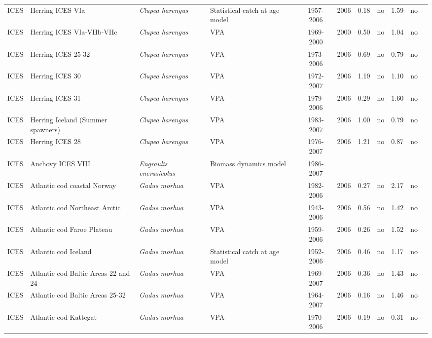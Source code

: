 \begin{longtable}{p{1.8cm}p{3.5cm}p{3.5cm}p{3cm}cccp{0.9cm}cp{0.9cm}c}
  ICES & Herring ICES VIa & \textit{Clupea harengus} & Statistical catch at age model & 1957-2006 & 2006 & 0.18 & no & 1.59 & no & \cite{ICES-HAWG-2007.pdf} \\ 
  ICES & Herring ICES VIa-VIIb-VIIc & \textit{Clupea harengus} & VPA & 1969-2000 & 2000 & 0.50 & no & 1.04 & no & \cite{ICES-HAWG-2007.pdf} \\ 
  ICES & Herring ICES 25-32 & \textit{Clupea harengus} & VPA & 1973-2006 & 2006 & 0.69 & no & 0.79 & no & \cite{ICES-WGBFAS-2007.pdf} \\ 
  ICES & Herring ICES 30 & \textit{Clupea harengus} & VPA & 1972-2007 & 2006 & 1.19 & no & 1.10 & no & \cite{ICES-WGBFAS-2007.pdf} \\ 
  ICES & Herring ICES 31 & \textit{Clupea harengus} & VPA & 1979-2006 & 2006 & 0.29 & no & 1.60 & no & \cite{ICES-WGBFAS-2007.pdf} \\ 
  ICES & Herring Iceland (Summer spawners) & \textit{Clupea harengus} & VPA & 1983-2007 & 2006 & 1.00 & no & 0.79 & no & \cite{ICES-NWWG-2007.pdf} \\ 
  ICES & Herring ICES 28 & \textit{Clupea harengus} & VPA & 1976-2007 & 2006 & 1.21 & no & 0.87 & no & \cite{ICES-WGBFAS-2007.pdf} \\ 
  ICES & Anchovy ICES VIII & \textit{Engraulis encrasicolus} & Biomass dynamics model & 1986-2007 &  &  &  &  &  & \cite{ICES-WGMHSA007.pdf} \\ 
  ICES & Atlantic cod coastal Norway & \textit{Gadus morhua} & VPA & 1982-2006 & 2006 & 0.27 & no & 2.17 & no & \cite{ICES-AFWG-2007.pdf} \\ 
  ICES & Atlantic cod Northeast Arctic & \textit{Gadus morhua} & VPA & 1943-2006 & 2006 & 0.56 & no & 1.42 & no & \cite{ICES-AFWG-2007.pdf} \\ 
  ICES & Atlantic cod Faroe Plateau & \textit{Gadus morhua} & VPA & 1959-2006 & 2006 & 0.26 & no & 1.52 & no & \cite{ICES-NWWG-2007.pdf} \\ 
  ICES & Atlantic cod Iceland & \textit{Gadus morhua} & Statistical catch at age model & 1952-2006 & 2006 & 0.46 & no & 1.17 & no & \cite{ICES-NWWG-2007.pdf} \\ 
  ICES & Atlantic cod Baltic Areas 22 and 24 & \textit{Gadus morhua} & VPA & 1969-2007 & 2006 & 0.36 & no & 1.43 & no & \cite{ICES-WGBFAS-2007.pdf} \\ 
  ICES & Atlantic cod Baltic Areas 25-32 & \textit{Gadus morhua} & VPA & 1964-2007 & 2006 & 0.16 & no & 1.46 & no & \cite{ICES-WGBFAS-2007.pdf} \\ 
  ICES & Atlantic cod Kattegat & \textit{Gadus morhua} & VPA & 1970-2006 & 2006 & 0.19 & no & 0.31 & no & \cite{ICES-WGBFAS-2007.pdf} \\ 

\end{longtable}
